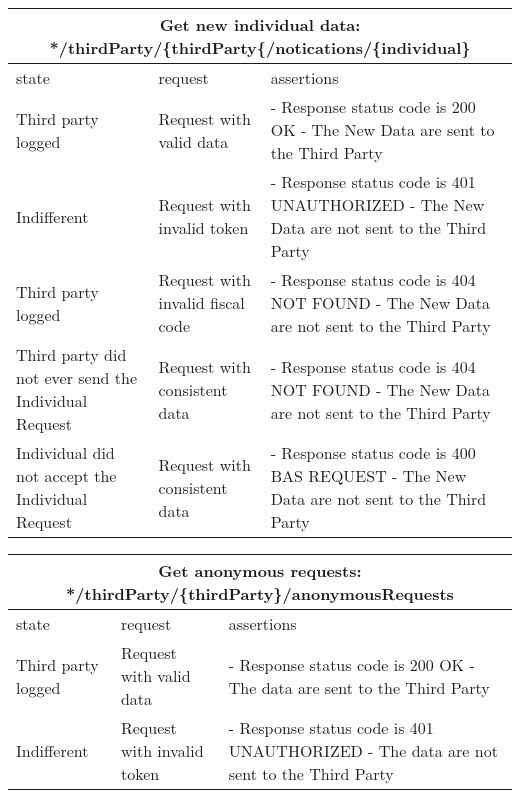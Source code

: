 \begin{center}
	\begin{tabular}{|p{}|p{}|p{}|}
		\hline
		\multicolumn{3}{c}{Get new individual data: */thirdParty/\{thirdParty\{/notications/\{individual\}}\\

		\hline
		state & request & assertions \\
		
		\hline
		Third party logged&
		Request with valid data & 
		- Response status code is 200 OK\newline
		- The New Data are sent to the Third Party
		\\
		
		\hline
		Indifferent&
		Request with invalid token & 
		- Response status code is 401 UNAUTHORIZED \newline
		- The New Data are not sent to the Third Party
		\\
		\hline
		Third party logged&
		Request with invalid fiscal code & 
		- Response status code is 404 NOT FOUND\newline
		- The New Data are not sent to the Third Party
		\\
		\hline
		Third party did not ever send the Individual Request&
		Request with consistent data & 
		- Response status code is 404 NOT FOUND\newline
		- The New Data are not sent to the Third Party
		\\
		\hline
		Individual did not accept the Individual Request&
		Request with consistent data & 
		- Response status code is 400 BAS REQUEST\newline
		- The New Data are not sent to the Third Party
		\\

	\end{tabular}
\end{center}

\begin{center}
	\begin{tabular}{|p{}|p{}|p{}|}
		\hline
		\multicolumn{3}{c}{Get anonymous requests: */thirdParty/\{thirdParty\}/anonymousRequests}\\

		\hline
		state & request & assertions \\
		
		\hline
		Third party logged&
		Request with valid data & 
		- Response status code is 200 OK\newline
		- The data are sent to the Third Party
		\\
		
		\hline
		Indifferent&
		Request with invalid token & 
		- Response status code is 401 UNAUTHORIZED \newline
		- The data are not sent to the Third Party
		\\

	\end{tabular}
\end{center}

